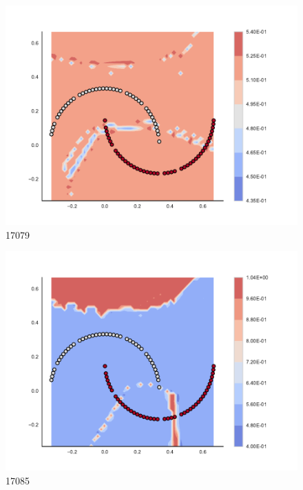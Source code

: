 \begin{subfigure}[b]{0.09\textwidth}
    \includegraphics[clip, trim=2.35cm 1.75cm 4.5cm 0cm,width=\textwidth]{img/convergence/17079.pdf}
    \caption{17079}
    \label{fig:convergence_17079}
\end{subfigure}
%
\begin{subfigure}[b]{0.09\textwidth}
    \includegraphics[clip, trim=2.35cm 1.75cm 4.5cm 0cm,width=\textwidth]{img/convergence/17085.pdf}
    \caption{17085}
    \label{fig:convergence_17085}
\end{subfigure}
%
